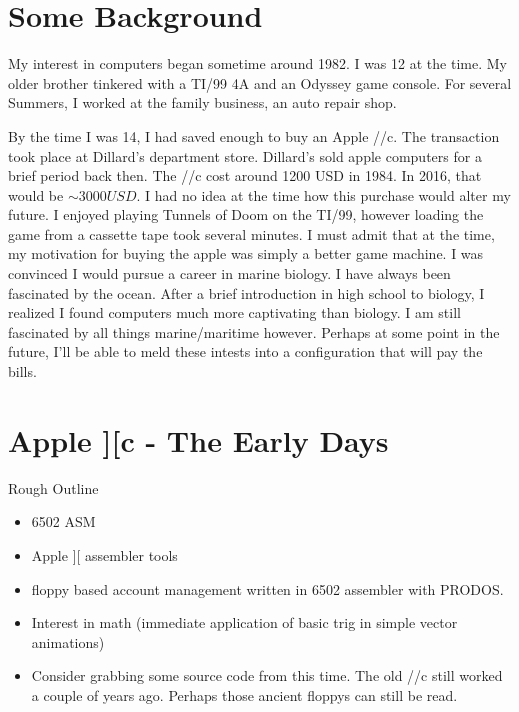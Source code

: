 
\section{Some  Background}
My interest in computers began sometime around 1982. I was 12 at the
time. My older brother tinkered with a TI/99 4A and an Odyssey game
console. For several Summers, I worked at the family business, an auto
repair shop. 

By the time I was 14, I had saved enough to buy an Apple
//c. The transaction took place at Dillard's department store. Dillard's
sold apple computers for a brief period back then. The //c
cost around 1200 USD in 1984. In 2016, that would be ${\sim} 3000 USD$.
I had no idea at the time how this purchase would alter my future.
I enjoyed playing Tunnels of Doom on the TI/99, however loading the 
game from a cassette tape took several minutes. I must admit that at
the time, my motivation for buying the apple was simply a better game
machine. I was convinced I would pursue a career in marine 
biology. I have always been fascinated by the ocean. After a brief 
introduction in high school to biology, I realized I found computers 
much more captivating than biology. I am still fascinated by
all things marine/maritime however. Perhaps at some point in the
future, I'll be able to meld these intests into a configuration that
will pay the bills.

\section{Apple ][c - The Early Days}
	Rough Outline
	\begin{itemize}
	\item 6502 ASM
	\item Apple ][ assembler tools
	\item floppy based account management written in 6502 assembler with PRODOS.
	\item Interest in math (immediate application of basic trig in simple vector animations)
	\item Consider grabbing some source code from this time. The old //c still worked a couple of years ago. Perhaps those ancient floppys can still be read.
	\end{itemize}

